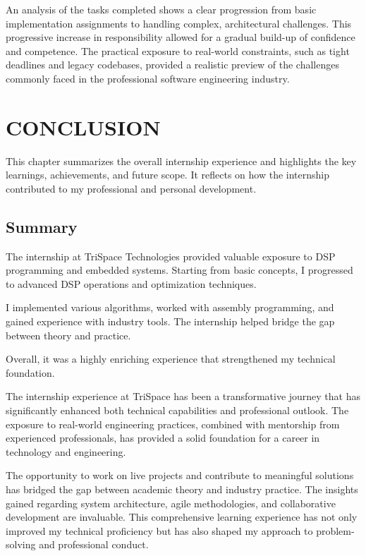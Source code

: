 \documentclass[12pt,a4paper]{report}
\begin{document}
An analysis of the tasks completed shows a clear progression from basic implementation assignments to handling complex, architectural challenges. This progressive increase in responsibility allowed for a gradual build-up of confidence and competence. The practical exposure to real-world constraints, such as tight deadlines and legacy codebases, provided a realistic preview of the challenges commonly faced in the professional software engineering industry.




\chapter{CONCLUSION}
\label{ch:conclusion}


This chapter summarizes the overall internship experience and highlights the key learnings, achievements, and future scope. It reflects on how the internship contributed to my professional and personal development.




\section{Summary}

The internship at TriSpace Technologies provided valuable exposure to DSP programming and embedded systems. Starting from basic concepts, I progressed to advanced DSP operations and optimization techniques.


I implemented various algorithms, worked with assembly programming, and gained experience with industry tools. The internship helped bridge the gap between theory and practice.


Overall, it was a highly enriching experience that strengthened my technical foundation.


The internship experience at TriSpace has been a transformative journey that has significantly enhanced both technical capabilities and professional outlook. The exposure to real-world engineering practices, combined with mentorship from experienced professionals, has provided a solid foundation for a career in technology and engineering.


The opportunity to work on live projects and contribute to meaningful solutions has bridged the gap between academic theory and industry practice. The insights gained regarding system architecture, agile methodologies, and collaborative development are invaluable. This comprehensive learning experience has not only improved my technical proficiency but has also shaped my approach to problem-solving and professional conduct.
\end{document}
